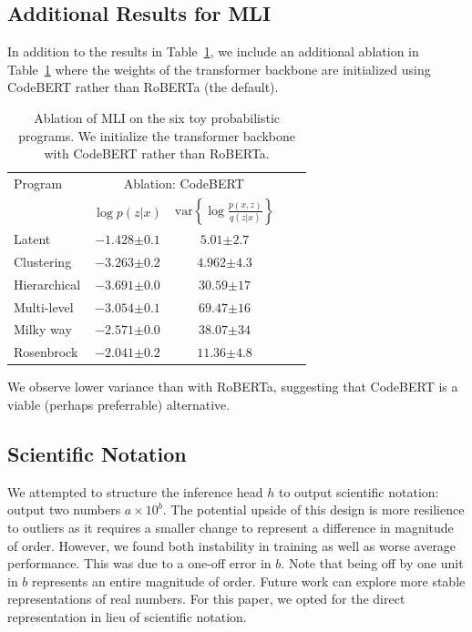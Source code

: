 \subsection{Additional Results for MLI}

In addition to the results in Table~\ref{tab:toy}, we include an additional ablation in Table~\ref{tab:toy} where the weights of the transformer backbone are initialized using CodeBERT \cite{feng2020codebert} rather than RoBERTa (the default).

\begin{table}[h!]
\centering
\begin{tabular}{lcccc}
\toprule
Program & \multicolumn{2}{c}{Ablation: CodeBERT} \\
& $\log p(z|x)$ & $\text{var}\left\{\log \frac{p(x,z)}{q(z|x)}\right\}$ \\
\midrule
Latent & $-1.428${\tiny$\pm 0.1$} & $5.01${\tiny$\pm 2.7$} \\
Clustering & $-3.263${\tiny$\pm 0.2$} & $4.962${\tiny$\pm 4.3$} \\
Hierarchical & $-3.691${\tiny$\pm 0.0$} & $30.59${\tiny$\pm 17$} \\
Multi-level & $-3.054${\tiny$\pm 0.1$} & $69.47${\tiny$\pm 16$} \\
Milky way & $-2.571${\tiny$\pm 0.0$} & $38.07${\tiny$\pm 34$} \\
Rosenbrock & $-2.041${\tiny$\pm 0.2$} & $11.36${\tiny$\pm 4.8$} \\
\bottomrule
\end{tabular}
\caption{Ablation of MLI on the six toy probabilistic programs. We initialize the transformer backbone with CodeBERT rather than RoBERTa.}
\label{tab:toy}
\end{table}
We observe lower variance than with RoBERTa, suggesting that CodeBERT is a viable (perhaps preferrable) alternative. 

\subsection{Scientific Notation}

We attempted to structure the inference head $h$ to output scientific notation: output two numbers $a \times 10^b$. The potential upside of this design is more resilience to outliers as it requires a smaller change to represent a difference in magnitude of order. However, we found both instability in training as well as worse average performance. This was due to a one-off error in $b$. Note that being off by one unit in $b$ represents an entire magnitude of order. Future work can explore more stable representations of real numbers. For this paper, we opted for the direct representation in lieu of scientific notation.

